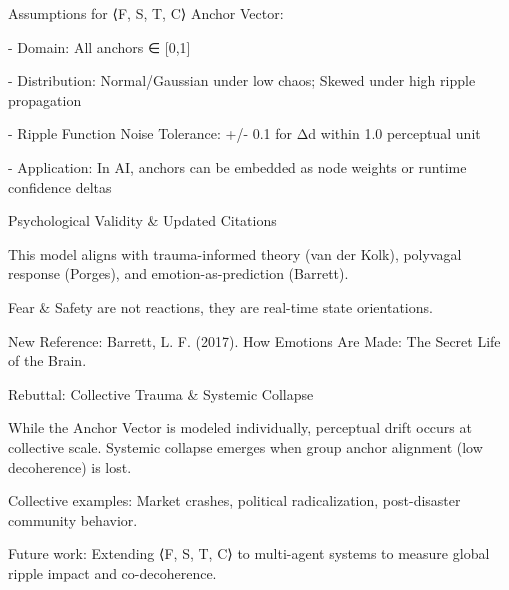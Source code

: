 \documentclass[11pt]{article}
\begin{document}
Assumptions for ⟨F, S, T, C⟩ Anchor Vector:

- Domain: All anchors ∈ [0,1]

- Distribution: Normal/Gaussian under low chaos; Skewed under high ripple propagation

- Ripple Function Noise Tolerance: +/- 0.1 for Δd within 1.0 perceptual unit

- Application: In AI, anchors can be embedded as node weights or runtime confidence deltas

Psychological Validity & Updated Citations

This model aligns with trauma-informed theory (van der Kolk), polyvagal response (Porges), and emotion-as-prediction (Barrett).

Fear & Safety are not reactions, they are real-time state orientations.

New Reference: Barrett, L. F. (2017). How Emotions Are Made: The Secret Life of the Brain.

Rebuttal: Collective Trauma & Systemic Collapse

While the Anchor Vector is modeled individually, perceptual drift occurs at collective scale. Systemic collapse emerges when group anchor alignment (low decoherence) is lost.

Collective examples: Market crashes, political radicalization, post-disaster community behavior.

Future work: Extending ⟨F, S, T, C⟩ to multi-agent systems to measure global ripple impact and co-decoherence.
\end{document}
